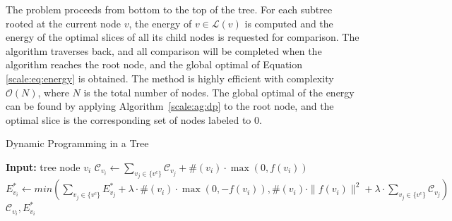 



The problem proceeds from bottom to the top of the tree.
For each subtree rooted at the current node $v$, the energy of $v \in
\mathcal{L}(v)$ is computed and the energy of the optimal slices of
all its child nodes is requested for comparison.
The algorithm traverses back, and all comparison will be completed when the algorithm reaches the root
node, and the global optimal of Equation \ref{scale:eq:energy} is obtained.
The method is highly efficient with complexity $\mathcal{O}(N)$, where $N$ is the total number of nodes.
The global optimal of the energy can be found by applying Algorithm~\ref{scale:ag:dp} to the root node,
and the optimal slice is the corresponding set of nodes labeled to $0$. 

\begin{algorithm}[tb]
\caption{Dynamic Programming in a Tree}
\label{scale:ag:dp}
\begin{algorithmic}
\STATE \textbf{Input:} tree node $v_i$
\ELSE
\STATE $\mathcal{C}_{v_i} \gets  \sum_{v_j \in \{v^c\}}\mathcal{C}_{v_j} + \#(v_i) \cdot \max(0, f(v_i))$
\STATE $E^*_{v_i} \gets min(\sum_{v_j \in \{v^c\}}E^*_{v_j} + \lambda \cdot \#(v_i) \cdot \max(0, -f(v_i)), \#(v_i) \cdot \|f(v_i)\|^2 + \lambda \cdot \sum_{v_j \in \{v^c\}}\mathcal{C}_{v_j})$
\ENDIF
\RETURN $\mathcal{C}_{v_i},E^*_{v_i}$ 
\end{algorithmic}
\end{algorithm}

